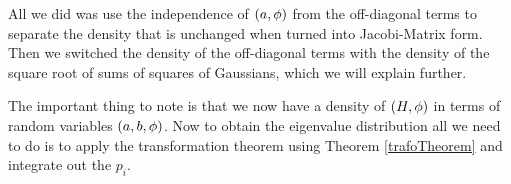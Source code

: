 All we did was use the independence of $(a,\phi)$ from the off-diagonal terms to separate the density that is unchanged when turned into Jacobi-Matrix form. Then we switched the density of the off-diagonal terms with the density of the square root of sums of squares of Gaussians, which we will explain further.

The important thing to note is that we now have a density of $(H,\phi)$ in terms of random variables $(a,b,\phi)$. Now to obtain the eigenvalue distribution all we need to do is to apply the transformation theorem using Theorem \ref{trafoTheorem} and integrate out the $p_i$.